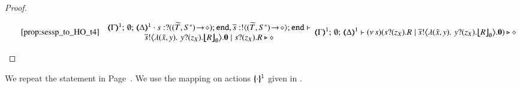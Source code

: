 \begin{proof}
\begin{enumerate}[1.]
\[{{\begin{array}{rclc}
						& \eqref{prop:sessp_to_HO_t4}
					\end{array}
				}{
				\begin{array}{c}
					\tmap{\Gamma}{1};\, \es;\, \tmap{\Delta}{1}
					\cat s:\btinp{\shot{(\widetilde{T},S^*)}}\tinact , \dual{s}:\btout{\shot{(\widetilde{T},S^*)}}\tinact
					\proves
					\\
					\bbout{\dual{s}}{\abs{(\tilde{x}, y )} \,{\binp{y}{z_X} \auxmapp{R}{{}}{\es}}} \inact 
					\Par 
					\binp{s}{z_X} R 
					\hastype \Proc
					\end{array}
				}
			}{
				\tmap{\Gamma}{1};\, \es;\, \tmap{\Delta}{1} 
				\proves
				\newsp{s}{\binp{s}{z_X} R \Par 
				\bbout{\dual{s}}{\abs{(\tilde{x},y) } \,{\binp{y}{z_X} \auxmapp{R}{{}}{\es}}} \inact} \hastype \Proc
			}
			\]
	\end{enumerate}
\end{proof}







We repeat the statement in Page~\pageref{prop:op_corr_HOp_to_HO}.
We use the mapping on actions $\{\!\!\{\cdot\}\!\!\}^{\mathtt{1}}$ given in .

\begin{proposition}\rm
	\label{app:prop:op_corr_HOp_to_HO}
	
\end{proposition}


